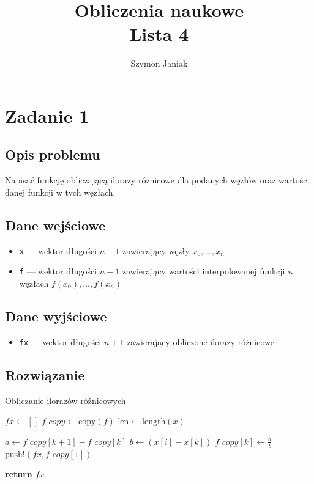 \documentclass{article}
\title{%
	Obliczenia naukowe \\
	\large Lista 4}
\author{Szymon Janiak}
\begin{document}
\maketitle

\section*{Zadanie 1}
\subsection*{Opis problemu}
	Napisać funkcję obliczającą ilorazy różnicowe dla podanych węzłów oraz wartości danej funkcji w tych węzłach.
\subsection*{Dane wejściowe}\label{1.in-data}
	\begin{itemize}
		\item \texttt{x} — wektor długości $n + 1$ zawierający węzły $x_0 ,\dots ,x_n$
		\item \texttt{f} — wektor długości $n + 1$ zawierający wartości interpolowanej funkcji w węzłach $f(x_0), \dots, f(x_n)$
	\end{itemize}
\subsection*{Dane wyjściowe}
	\begin{itemize}
	    \item \texttt{fx} — wektor długości $n + 1$ zawierający obliczone ilorazy różnicowe
	\end{itemize}
\subsection*{Rozwiązanie}
	\begin{algorithm}
	\caption{Obliczanie ilorazów różnicowych}
	\begin{algorithmic}[1]
	        \State $fx \gets []$
	        \State $f\_copy \gets \text{copy}(f)$
	        \State $\text{len} \gets \text{length}(x)$
	        
	                \State $a \gets f\_copy[k + 1] - f\_copy[k]$
	                \State $b \gets (x[i] - x[k])$
	                \State $f\_copy[k] \gets \frac{a}{b}$
	            \EndFor
	            \State $\text{push!}(fx, f\_copy[1])$
	        \EndFor
	        
	        \State \textbf{return} $fx$
	    \EndFunction
	\end{algorithmic}
	\end{algorithm}
\end{document}
